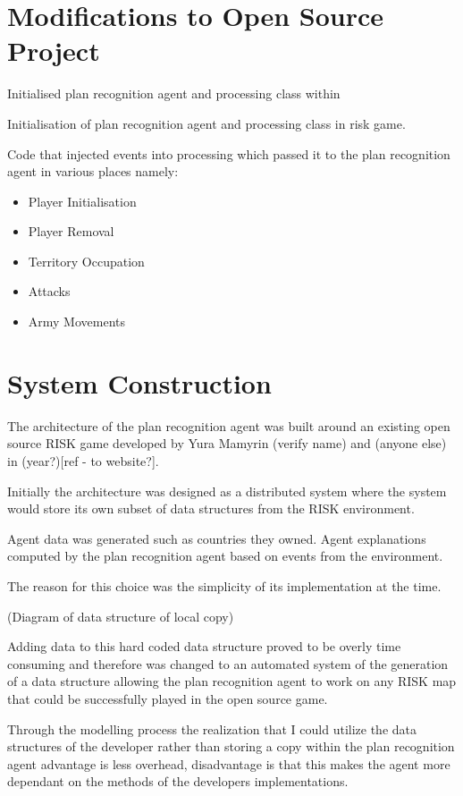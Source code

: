 \documentclass[parskip]{cs4rep}
\begin{document}
\section{Modifications to Open Source Project}

Initialised plan recognition agent and processing class within 

Initialisation of plan recognition agent and processing class in risk game.

Code that injected events into processing which passed it to the plan recognition agent in various places namely:

\begin{itemize}
\item
Player Initialisation
\item
Player Removal
\item
Territory Occupation
\item
Attacks
\item
Army Movements
\end{itemize}

\section{System Construction}

The architecture of the plan recognition agent was built around an existing open source RISK game developed by Yura Mamyrin (verify name) and (anyone else) in (year?)[ref - to website?].

Initially the architecture was designed as a distributed system where the system would store its own subset of data structures from the RISK environment.

Agent data was generated such as countries they owned.
Agent explanations computed by the plan recognition agent based on events from the environment.

The reason for this choice was the simplicity of its implementation at the time.

(Diagram of data structure of local copy)

Adding data to this hard coded data structure proved to be overly time consuming and therefore was changed to an automated system of the generation of a data structure allowing the plan recognition agent to work on any RISK map that could be successfully played in the open source game.

Through the modelling process the realization that I could utilize the data structures of the developer rather than storing a copy within the plan recognition agent advantage is less overhead, disadvantage is that this makes the agent more dependant on the methods of the developers implementations.
\end{document}
